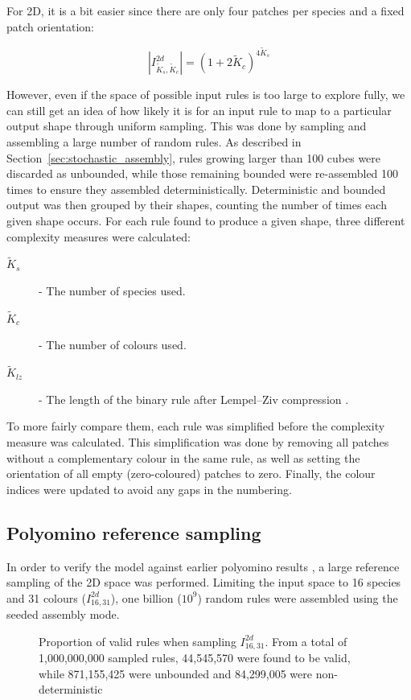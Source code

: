 For 2D, it is a bit easier since there are only four patches per species and a fixed patch orientation:

\[
\left\lvert I_{\widetilde{K}_s, \widetilde{K}_c}^{2d}\right\rvert = (1+2\widetilde{K}_c)^{4\widetilde{K}_s}
\]

However, even if the space of possible input rules is too large to explore fully, we can still get an idea of how likely it is for an input rule to map to a particular output shape through uniform sampling. This was done by sampling and assembling a large number of random rules. As described in Section~\ref{sec:stochastic_assembly}, rules growing larger than 100 cubes were discarded as unbounded, while those remaining bounded were re-assembled 100 times to ensure they assembled deterministically. Deterministic and bounded output was then grouped by their shapes, counting the number of times each given shape occurs. For each rule found to produce a given shape, three different complexity measures were calculated:
\begin{description}
    \item[\(\widetilde{K}_s\)] - The number of species used.
    \item[\(\widetilde{K}_c\)] - The number of colours used.
    \item[\(\widetilde{K}_{lz}\)] - The length of the binary rule after Lempel–Ziv compression \cite{lempel-ziv}. 
\end{description}

To more fairly compare them, each rule was simplified before the complexity measure was calculated. This simplification was done by removing all patches without a complementary colour in the same rule, as well as setting the orientation of all empty (zero-coloured) patches to zero. Finally, the colour indices were updated to avoid any gaps in the numbering.

\subsection{Polyomino reference sampling}
\label{sec:refcalc}
In order to verify the model against earlier polyomino results \cite{johnston2021}, a large reference sampling of the 2D space was performed. Limiting the input space to 16 species and 31 colours (\(I_{16,31}^{2d}\)), one billion (\(10^9\)) random rules were assembled using the seeded assembly mode.

\begin{figure}[h]
    \centering
    \caption{Proportion of valid rules when sampling \(I_{16,31}^{2d}\). From a total of 1,000,000,000 sampled rules, 44,545,570 were found to be valid, while 871,155,425 were  unbounded and 84,299,005 were non-deterministic}
    \label{fig:ref_validity}
\end{figure}

